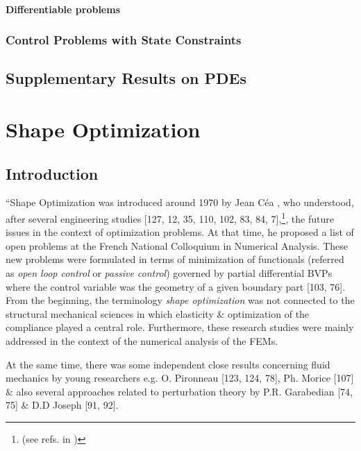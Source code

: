 \documentclass[oneside]{book}
\numberwithin{equation}{section}
\begin{document}
\subsubsection{Differentiable problems}

\subsection{Control Problems with State Constraints}

\section{Supplementary Results on PDEs}


\chapter{Shape Optimization}

\section{Introduction}
``Shape Optimization was introduced around 1970 by Jean C\'ea \cite{Cea_Gioan_Michel1973}, who understood, after several engineering studies [127, 12, 35, 110, 102, 83, 84, 7],\footnote{(see refs. in \cite{Moubachir_Zolesio2006})}, the future issues in the context of optimization problems. At that time, he proposed a list of open problems at the French National Colloquium in Numerical Analysis. These new problems were formulated in terms of minimization of functionals (referred as \textit{open loop control} or \textit{passive control}) governed by partial differential BVPs where the control variable was the geometry of a given boundary part [103, 76]. From the beginning, the terminology \textit{shape optimization} was not connected to the structural mechanical sciences in which elasticity \& optimization of the compliance played a central role. Furthermore, these research studies were mainly addressed in the context of the numerical analysis of the FEMs.

At the same time, there was some independent close results concerning fluid mechanics by young researchers e.g. O. Pironneau [123, 124, 78], Ph. Morice [107] \& also several approaches related to perturbation theory by P.R. Garabedian [74, 75] \& D.D Joseph [91, 92].
\end{document}
